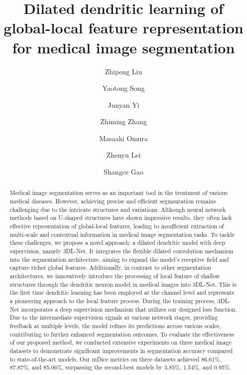 \documentclass[review]{elsarticle}
\begin{document}
	
	\begin{frontmatter}
		
		\title{Dilated dendritic learning of global-local feature representation for medical image segmentation}
		\author[label1]{Zhipeng Liu} %
		\author[label1]{Yaotong Song} %
		\author[label2]{Junyan Yi} %
		\author[label1]{Zhiming Zhang} %
		\author[label1]{Masaaki Omura} %
		\author[label1]{Zhenyu Lei} %
		\author[label1]{Shangce Gao}
		
		\address[label1]{Faculty of Engineering, University of Toyama, Toyama-shi, 930-8555 Japan.}
		\address[label2]{Department of Computer Science and Technology, Beijing University of Civil Engineering and Architecture, Beijing 100044, China.}
		
		
		\begin{abstract}
			Medical image segmentation serves as an important tool in the treatment of various medical diseases. However, achieving precise and efficient segmentation remains challenging due to the intricate structures and variations. Although neural network methods based on U-shaped structures have shown impressive results, they often lack effective representation of global-local features, leading to insufficient extraction of multi-scale and contextual information in medical image segmentation tasks. To tackle these challenges, we propose a novel approach: a dilated dendritic model with deep supervision, namely 3DL-Net. It integrates the flexible dilated convolution mechanism into the segmentation architecture, aiming to expand the model’s receptive field and capture richer global features. Additionally, in contrast to other segmentation architectures, we innovatively introduce the processing of  local feature of shallow structures through the dendritic neuron model in medical images into 3DL-Net.  This is the first time dendritic learning has been employed at the channel level and represents a pioneering approach to the local feature process. During the training process, 3DL-Net incorporates a deep supervision mechanism that utilizes our designed loss function. Due to the intermediate supervision signals at various network stages, providing feedback at multiple levels, the model refines its predictions across various scales, contributing to further enhanced segmentation outcomes. To evaluate the effectiveness of our proposed method, we conducted extensive experiments on three medical image datasets to demonstrate significant improvements in segmentation accuracy compared to state-of-the-art models. Our mDice metrics on three datasets achieved 86.61\%, 87.87\%, and 85.06\%, surpassing the second-best models by 3.85\%, 1.54\%, and 0.95\%.


\end{abstract}
\end{frontmatter}
\end{document}
